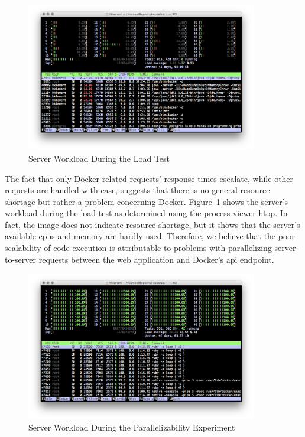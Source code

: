 \begin{figure}
\centering
\includegraphics[width=0.9\textwidth]{images/htop1.png}
\vspace{-0.75cm}
\caption{Server Workload During the Load Test}
\label{figure:htop1}
\end{figure}

The fact that only Docker-related requests' response times escalate, while other requests are handled with ease, suggests that there is no general resource shortage but rather a problem concerning Docker. Figure~\ref{figure:htop1} shows the server's workload during the load test as determined using the process viewer htop. In fact, the image does not indicate resource shortage, but it shows that the server's available \glspl{cpu} and memory are hardly used. Therefore, we believe that the poor scalability of code execution is attributable to problems with parallelizing server-to-server requests between the web application and Docker's \gls{api} endpoint.

\begin{figure}
\centering
\includegraphics[width=0.9\textwidth]{images/htop2.png}
\vspace{-0.75cm}
\caption{Server Workload During the Parallelizability Experiment}
\label{figure:htop2}
\end{figure}

